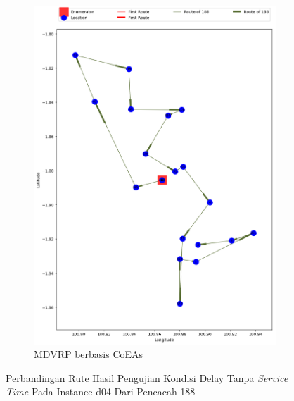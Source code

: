 \begin{figure}[H]
	\centering
	\begin{subfigure}[t]{\textwidth}
		\centering
		\includegraphics[width=\textwidth]{Resources/Images/delayed_5/real_m15_n100_delayed_5_188_coes}
		\caption{MDVRP berbasis CoEAs}
		\label{fig:real_m15_n100_delayed_5_188_coes}
	\end{subfigure}
	\caption{Perbandingan Rute Hasil Pengujian Kondisi Delay Tanpa \textit{Service Time} Pada Instance d04 Dari Pencacah 188}
	\label{fig:real_m15_n100_delayed_5_188}
\end{figure}


